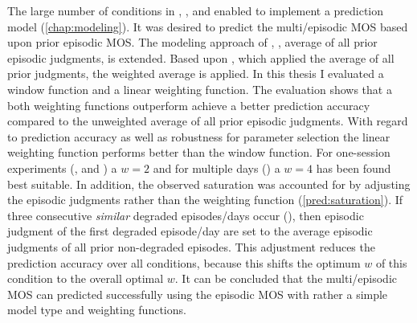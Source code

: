 The large number of conditions in , \EIIa{}, and  enabled to implement a prediction model (\autoref{chap:modeling}).
It was desired to predict the multi\-/episodic \ac{MOS} based upon prior episodic \ac{MOS}.
The modeling approach of \cite{moller_single-call_2011}, \ie, average of all prior episodic judgments, is extended.
Based upon \cite{moller_single-call_2011}, which applied the average of all prior judgments, the weighted average is applied.
In this thesis I evaluated a window function and a linear weighting function.
The evaluation shows that a both weighting functions outperform achieve a better prediction accuracy compared to the unweighted average of all prior episodic judgments.
With regard to prediction accuracy as well as robustness for parameter selection the linear weighting function performs better than the window function.
For one-session experiments (, and \EIIa{}) a $\mathit{w}=2$ and for multiple days () a $\mathit{w}=4$ has been found best suitable.
In addition, the observed saturation was accounted for by adjusting the episodic judgments rather than the weighting function (\autoref{pred:saturation}).
If three consecutive \emph{similar} degraded episodes/days occur (), then episodic judgment of the first degraded episode/day are set to the average episodic judgments of all prior non-degraded episodes.
This adjustment reduces the prediction accuracy over all conditions, because this shifts the optimum $\mathit{w}$ of this condition to the overall optimal $\mathit{w}$.
It can be concluded that the multi\-/episodic \ac{MOS} can predicted successfully using the episodic \ac{MOS} with rather a simple model type and weighting functions.

